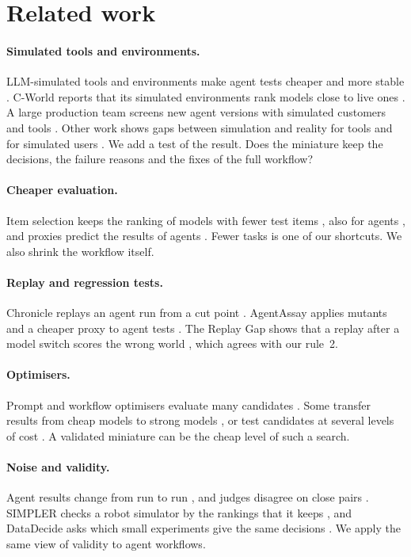 \section{Related work}
\label{sec:related}

\paragraph{Simulated tools and environments.}
LLM-simulated tools and environments make agent tests cheaper and more stable
\citep{ruan2023identifying,guo2024stabletoolbench,hu2026occubench}. C-World reports that its simulated
environments rank models close to live ones \citep{xi2026cworld}. A large production team screens
new agent versions with simulated customers and tools \citep{alcoba2026screen}. Other work shows
gaps between simulation and reality for tools \citep{zhou2026when} and for simulated users
\citep{seshadri2026lost}. We add a test of the result. Does the miniature keep the decisions, the
failure reasons and the fixes of the full workflow?

\paragraph{Cheaper evaluation.}
Item selection keeps the ranking of models with fewer test items \citep{polo2024tinybenchmarks},
also for agents \citep{ndzomga2026efficient,ayyad2026trajectory}, and proxies predict the results
of agents \citep{song2026pace}. Fewer tasks is one of our shortcuts. We also shrink the workflow
itself.

\paragraph{Replay and regression tests.}
Chronicle replays an agent run from a cut point \citep{chawla2026chronicle}. AgentAssay applies
mutants and a cheaper proxy to agent tests \citep{bhardwaj2026agentassay}. The Replay Gap shows
that a replay after a model switch scores the wrong world \citep{gonuguntla2026replaygap}, which
agrees with our rule~2.

\paragraph{Optimisers.}
Prompt and workflow optimisers evaluate many candidates
\citep{khattab2023dspy,agrawal2025gepa,wu2025optimas}. Some transfer results from cheap models to
strong models \citep{oved2026optimize}, or test candidates at several levels of cost \citep{li2018hyperband}. A
validated miniature can be the cheap level of such a search.

\paragraph{Noise and validity.}
Agent results change from run to run \citep{chen2026noisefloor,wiedmann2026agents}, and judges
disagree on close pairs \citep{bodhwani2026gauge}. SIMPLER checks a robot simulator by the rankings
that it keeps \citep{li2024evaluating}, and DataDecide asks which small experiments give the same
decisions \citep{magnusson2025datadecide}. We apply the same view of validity to agent workflows.
